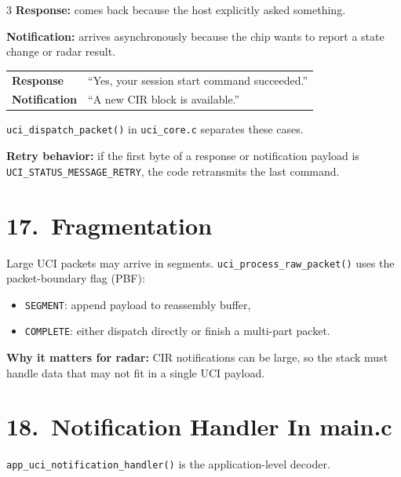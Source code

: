 \documentclass[10pt]{article}
\begin{document}
\begin{multicols*}{3}
\textbf{Response:}
comes back because the host explicitly asked something.

\textbf{Notification:}
arrives asynchronously because the chip wants to report a state change or radar result.

\begin{tcolorbox}[newbox={Examples}]
\begin{tabular}{@{}p{2cm}p{5.1cm}@{}}
\textbf{Response} & ``Yes, your session start command succeeded.'' \\
\textbf{Notification} & ``A new CIR block is available.'' \\
\end{tabular}
\end{tcolorbox}

\texttt{uci\_dispatch\_packet()} in \texttt{uci\_core.c} separates these cases.

\textbf{Retry behavior:}
if the first byte of a response or notification payload is \texttt{UCI\_STATUS\_MESSAGE\_RETRY}, the code retransmits the last command.

\section*{17.\ Fragmentation}

Large UCI packets may arrive in segments.
\texttt{uci\_process\_raw\_packet()} uses the packet-boundary flag (PBF):
\begin{itemize}
  \item \texttt{SEGMENT}: append payload to reassembly buffer,
  \item \texttt{COMPLETE}: either dispatch directly or finish a multi-part packet.
\end{itemize}

\textbf{Why it matters for radar:}
CIR notifications can be large, so the stack must handle data that may not fit in a single UCI payload.

\section*{18.\ Notification Handler In main.c}

\texttt{app\_uci\_notification\_handler()} is the application-level decoder.


\end{multicols*}
\end{document}
